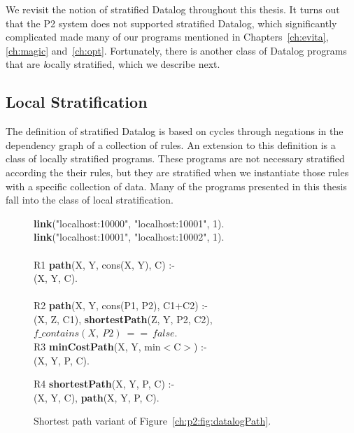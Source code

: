 We revisit the notion of stratified Datalog throughout this thesis.  It turns
out that the P2 system does not supported stratified Datalog, which
significantly complicated made many of our \OVERLOG programs mentioned in
Chapters~\ref{ch:evita}, \ref{ch:magic} and~\ref{ch:opt}.  Fortunately, there
is another class of Datalog programs that are {\emph locally} stratified, which
we describe next.

\subsection{Local Stratification}

The definition of stratified Datalog is based on cycles through negations in
the dependency graph of a collection of rules.  An extension to this definition
is a class of locally stratified programs.  These programs are not necessary
stratified according the their rules, but they are stratified when we
instantiate those rules with a specific collection of data.  Many of the
programs presented in this thesis fall into the class of local stratification.

\begin{figure}
\ssp
\begin{boxedminipage}{\linewidth}
{\bf link}("localhost:10000", "localhost:10001", 1). \\
{\bf link}("localhost:10001", "localhost:10002", 1). \\
\\
R1 {\bf path}(X, Y, cons(X, Y), C) :- \\
(X, Y, C). \\
\\       
R2 {\bf path}(X, Y, cons(P1, P2), C1+C2) :- \\
(X, Z, C1), {\bf shortestPath}(Z, Y, P2, C2), \\
\datalogspace $f\_contains(X,\ P2)\ ==\ false$. \\ 

R3 {\bf minCostPath}(X, Y, min$<$C$>$) :-  \\
(X, Y, P, C).

R4 {\bf shortestPath}(X, Y, P, C) :- \\
(X, Y, C), {\bf path}(X, Y, P, C).\\

\end{boxedminipage}
\caption{\label{ch:p2:fig:datalogSP}Shortest path variant of Figure~\ref{ch:p2:fig:datalogPath}.}
\end{figure}

